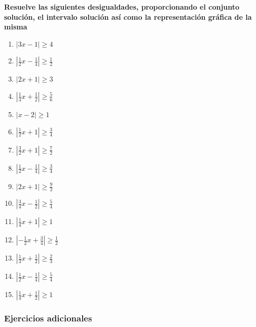 \documentclass[12pt]{article}
\begin{document}
\textbf{Resuelve las siguientes desigualdades, proporcionando el
conjunto solución, el intervalo solución así como la representación
gráfica de la misma}

\begin{enumerate}
\def\labelenumi{\arabic{enumi}.}
\item
  \(|3x-1|\geq 4\)
\item
  \(|\frac{1}{2}x-\frac{1}{4}|\geq\frac{1}{2}\)
\item
  \(|2x+1|\geq 3\)
\item
  \(|\frac{1}{3}x+\frac{1}{2}|\geq\frac{5}{6}\)
\item
  \(|x-2|\geq 1\)
\item
  \(|\frac{1}{2}x+1|\geq\frac{3}{4}\)
\item
  \(|\frac{3}{2}x+1|\geq\frac{7}{2}\)
\item
  \(|\frac{1}{2}x-\frac{1}{4}|\geq\frac{3}{4}\)
\item
  \(|2x+1|\geq\frac{9}{2}\)
\item
  \(|\frac{3}{4}x-\frac{1}{2}|\geq\frac{5}{4}\)
\item
  \(|\frac{1}{4}x+1|\geq 1\)
\item
  \(|-\frac{1}{2}x+\frac{3}{4}|\geq\frac{1}{2}\)
\item
  \(|\frac{1}{3}x+\frac{1}{2}|\geq\frac{2}{3}\)
\item
  \(|\frac{1}{2}x-\frac{1}{4}|\geq\frac{5}{4}\)
\item
  \(|\frac{1}{4}x+\frac{1}{2}|\geq 1\)
\end{enumerate}

\subsubsection{Ejercicios adicionales}\label{ejercicios-adicionales}
\end{document}
